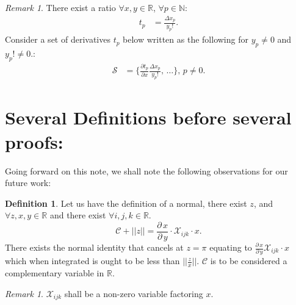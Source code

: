 \documentclass[10pt]{article}
\theoremstyle{plain}
\theoremstyle{definition}
\newtheorem{definition}[theorem]{Definition}
\theoremstyle{remark}
\newtheorem{remark}[theorem]{Remark}
\begin{document}
\begin{remark}
There exist a ratio $\forall x, y \in \mathbb{R}$, $\forall p \in \mathbb{N}$:
\begin{align*}
	t_p &= \frac{\Delta x_p}{y_p!}.
\end{align*}
Consider a set of derivatives $t_p$ below written as the following for $y_p \neq 0$ and $y_p! \neq 0$.:
\begin{align*}
	\mathcal{S} &= \{ \frac{\partial t_p}{\partial x} \frac{\Delta x_p}{y_p!}, \, \dots \}, \, p \neq 0.
\end{align*}
\end{remark}

\section{Several Definitions before several proofs:}

Going forward on this note, we shall note the following observations for our future work:

\begin{definition}
	Let us have the definition of a normal, there exist $z$, and $\forall z, x, y \in \mathbb{R}$ and there exist $\forall i, j, k \in \mathbb{R}$.
	\begin{equation}
		\mathcal{C} + ||z|| = \frac{\partial \, x}{\partial \, y} \cdot \mathcal{X}_{ijk} \cdot x.
	\end{equation}
	There exists the normal identity that cancels at $z=\pi$ equating to $\frac{\partial \, x}{\partial \, y} \mathcal{X}_{ijk} \cdot x$ which when integrated is ought to be less than $||\frac{z}{x}||$. $\mathcal{C}$ is to be considered a complementary variable in $\mathbb{R}$.
\end{definition}

\begin{remark}
	$\mathcal{X}_{ijk}$ shall be a non-zero variable factoring $x$.
\end{remark}
\end{document}
